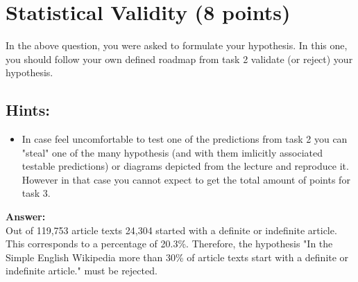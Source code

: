 \documentclass{WeSTassignment}
\begin{document}


\section{Statistical Validity (8 points)}
In the above question, you were asked to formulate your hypothesis. In this one, you should follow your own defined roadmap from task 2 validate (or reject) your hypothesis. 

\subsection{Hints:}
\begin{itemize}
\item In case feel uncomfortable to test one of the predictions from task 2 you can "steal" one of the many hypothesis (and with them imlicitly associated testable predictions) or diagrams depicted from the lecture and reproduce it. However in that case you cannot expect to get the total amount of points for task 3.
\end{itemize}

\textbf{Answer:}
\\
Out of 119,753 article texts 24,304 started with a definite or indefinite article. This corresponds to a percentage of 20.3\%. Therefore, the hypothesis "In the Simple English Wikipedia more than 30\% of article texts start with a definite or indefinite article." must be rejected. 
\end{document}
